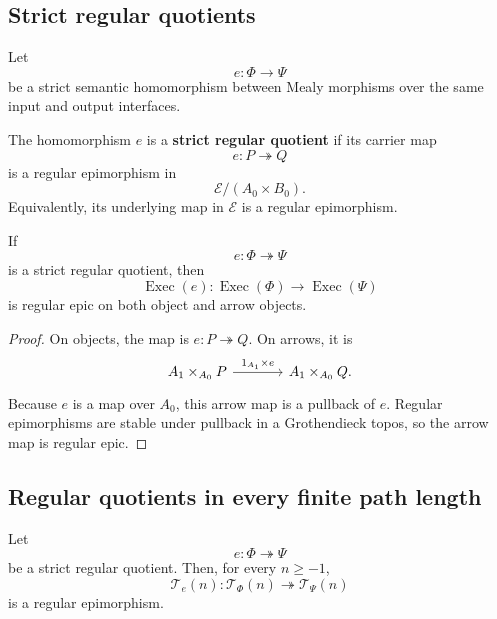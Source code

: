 \subsection{Strict regular quotients}
\label{subsec:strict-regular-quotients-temporal}

Let
\[
    e:\Phi\to\Psi
\]
be a strict semantic homomorphism between Mealy morphisms over the same input
and output interfaces.

\begin{definition}
\label{def:strict-regular-quotient-temporal}
The homomorphism \(e\) is a \textbf{strict regular quotient} if its carrier
map
\[
    e:P\twoheadrightarrow Q
\]
is a regular epimorphism in
\[
    \mathcal E/(A_0\times B_0).
\]
Equivalently, its underlying map in \(\mathcal E\) is a regular epimorphism.
\end{definition}

\begin{proposition}
\label{prop:execution-preserves-regular-quotients}
If
\[
    e:\Phi\twoheadrightarrow\Psi
\]
is a strict regular quotient, then
\[
    \operatorname{Exec}(e):
    \operatorname{Exec}(\Phi)
    \to
    \operatorname{Exec}(\Psi)
\]
is regular epic on both object and arrow objects.
\end{proposition}

\begin{proof}
On objects, the map is \(e:P\twoheadrightarrow Q\). On arrows, it is
\[
\begin{tikzcd}[column sep=large]
    A_1\times_{A_0}P
        \arrow[r, "{1_{A_1}\times e}"]
    &
    A_1\times_{A_0}Q.
\end{tikzcd}
\]
Because \(e\) is a map over \(A_0\), this arrow map is a pullback of \(e\).
Regular epimorphisms are stable under pullback in a Grothendieck topos, so the
arrow map is regular epic.
\end{proof}

\subsection{Regular quotients in every finite path length}
\label{subsec:levelwise-trajectory-quotients}

\begin{theorem}
\label{thm:temporal-preservation-regular-quotients}
Let
\[
    e:\Phi\twoheadrightarrow\Psi
\]
be a strict regular quotient. Then, for every \(n\geq-1\),
\[
    \mathscr T_e(n):
    \mathscr T_\Phi(n)
    \twoheadrightarrow
    \mathscr T_\Psi(n)
\]
is a regular epimorphism.
\end{theorem}

